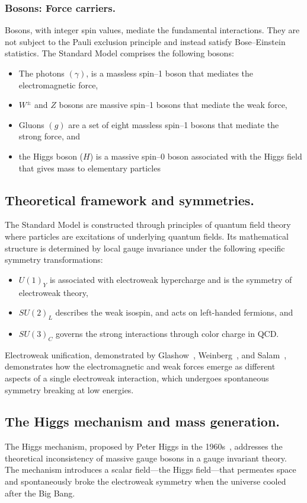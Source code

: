 \begin{definition}
\subsubsection{Bosons: Force carriers.}
Bosons, with integer spin values, mediate the fundamental interactions.
%
They are not subject to the Pauli exclusion principle and instead satisfy Bose--Einstein statistics.
%
The Standard Model comprises the following bosons:
\begin{itemize}
    \item The photons $(\gamma)$, is a massless spin--1 boson that mediates the electromagnetic force,
    \item $W^\pm$ and $Z$ bosons are massive spin--1 bosons that mediate the weak force,
    \item Gluons $(g)$ are a set of eight massless spin--1 bosons that mediate the strong force, and
    \item the Higgs boson ($H$) is a massive spin--0 boson associated with the Higgs field that gives mass to elementary particles
\end{itemize}

\subsection{Theoretical framework and symmetries.}
The Standard Model is constructed through principles of quantum field theory where particles are excitations of underlying quantum fields.
%
Its mathematical structure is determined by local gauge invariance under the following specific symmetry transformations:
\begin{itemize}
    \item $U(1)_Y$ is associated with electroweak hypercharge and is the symmetry of electroweak theory,
    \item $SU(2)_L$ describes the weak isospin, and acts on left-handed fermions, and
    \item $SU(3)_C$ governs the strong interactions through color charge in QCD.
\end{itemize}

Electroweak unification, demonstrated by Glashow~\cite{Glashow:1961tr}, Weinberg~\cite{Weinberg:1979pi}, and Salam~\cite{Salam:1980jd}, demonstrates how the electromagnetic and weak forces emerge as different aspects of a single electroweak interaction, which undergoes spontaneous symmetry breaking at low energies.

\subsection{The Higgs mechanism and mass generation.}
The Higgs mechanism, proposed by Peter Higgs in the 1960s~\cite{PhysRevLett.13.508}, addresses the theoretical inconsistency of massive gauge bosons in a gauge invariant theory.
%
The mechanism introduces a scalar field---the Higgs field---that permeates space and spontaneously broke the electroweak symmetry when the universe cooled after the Big Bang.


\end{definition}
